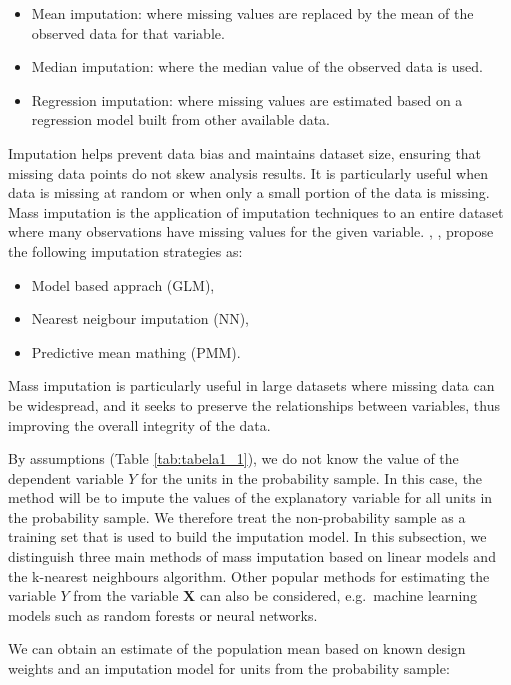 \documentclass[
]{jss}
\begin{document}
\begin{itemize}
    \item Mean imputation: where missing values are replaced by the mean of the observed data for that variable.
    \item Median imputation: where the median value of the observed data is used.
    \item Regression imputation: where missing values are estimated based on a regression model built from other available data.
\end{itemize}

Imputation helps prevent data bias and maintains dataset size, ensuring
that missing data points do not skew analysis results. It is
particularly useful when data is missing at random or when only a small
portion of the data is missing. Mass imputation is the application of
imputation techniques to an entire dataset where many observations have
missing values for the given variable. \cite{kim_combining_2021},
\cite{yang2021integration}, \cite{Beres} propose the following
imputation strategies as:

\begin{itemize}
    \item Model based apprach (GLM),
    \item Nearest neigbour imputation (NN),
    \item Predictive mean mathing (PMM).
\end{itemize}

Mass imputation is particularly useful in large datasets where missing
data can be widespread, and it seeks to preserve the relationships
between variables, thus improving the overall integrity of the data.

By assumptions (Table \ref{tab:tabela1_1}), we do not know the value of
the dependent variable \(Y\) for the units in the probability sample. In
this case, the method will be to impute the values of the explanatory
variable for all units in the probability sample. We therefore treat the
non-probability sample as a training set that is used to build the
imputation model. In this subsection, we distinguish three main methods
of mass imputation based on linear models and the k-nearest neighbours
algorithm. Other popular methods for estimating the variable \(Y\) from
the variable \(\boldsymbol{X}\) can also be considered, e.g.~machine
learning models such as random forests or neural networks.

We can obtain an estimate of the population mean based on known design
weights and an imputation model for units from the probability sample:
\end{document}
